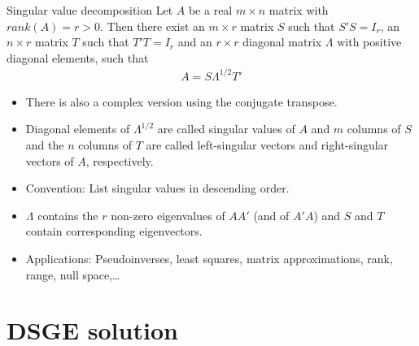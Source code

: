 \documentclass[handout]{beamer}  %
\begin{document}
\begin{frame}
\frametitle{\secname}\framesubtitle{}
\begin{block}{Singular value decomposition}
  Let $A$ be a real $m \times n$ matrix with $rank(A)=r>0$. Then there exist an $m\times r$ matrix $S$ such that $S'S=I_r$, an $n \times r$ matrix $T$ such that $T'T=I_r$ and an $r \times r$ diagonal matrix $\Lambda$ with positive diagonal elements, such that
  \begin{align*}
    A = S\Lambda^{1/2}T'
  \end{align*}
\end{block}
\begin{itemize}
  \item There is also a complex version using the conjugate transpose.
  \item Diagonal elements of $\Lambda^{1/2}$ are called singular values of $A$ and $m$ columns of $S$ and the $n$ columns of $T$ are called left-singular vectors and right-singular vectors of $A$, respectively.
  \item Convention: List singular values in descending order.
  \item $\Lambda$ contains the $r$ non-zero eigenvalues of $AA'$ (and of $A'A$) and $S$ and $T$ contain corresponding eigenvectors.
  \item Applications: Pseudoinverses, least squares, matrix approximations, rank, range, null space,\dots
\end{itemize}
\end{frame}

\section{DSGE solution}
\end{document}
